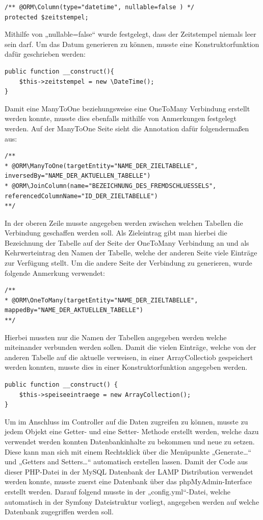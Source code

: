 	\lstset{language=php}
  	\begin{lstlisting}
/** @ORM\Column(type="datetime", nullable=false ) */
protected $zeitstempel;
  	\end{lstlisting}
Mithilfe von „nullable=false“ wurde festgelegt, dass der Zeitstempel niemals leer sein darf.
Um das Datum generieren zu können, musste eine Konstruktorfunktion dafür geschrieben werden:

	\lstset{language=php}
  	\begin{lstlisting}
public function __construct(){
	$this->zeitstempel = new \DateTime();
}
\end{lstlisting}
Damit eine ManyToOne beziehungsweise eine OneToMany Verbindung erstellt werden konnte, musste dies ebenfalls mithilfe von Anmerkungen festgelegt werden.
Auf der ManyToOne Seite sieht die Annotation dafür folgendermaßen aus:

	\lstset{language=php}
  	\begin{lstlisting}
/**
* @ORM\ManyToOne(targetEntity="NAME_DER_ZIELTABELLE",
inversedBy="NAME_DER_AKTUELLEN_TABELLE")
* @ORM\JoinColumn(name="BEZEICHNUNG_DES_FREMDSCHLUESSELS",
referencedColumnName="ID_DER_ZIELTABELLE")
**/
  	\end{lstlisting}
In der oberen Zeile musste angegeben werden zwischen welchen Tabellen die Verbindung geschaffen werden soll. Als Zieleintrag gibt man hierbei die Bezeichnung der Tabelle auf der Seite der OneToMany Verbindung an und als Kehrwerteintrag den Namen der Tabelle, welche der anderen Seite viele Einträge zur Verfügung stellt.
Um die andere Seite der Verbindung zu generieren, wurde folgende Anmerkung verwendet:

	\lstset{language=php}
  	\begin{lstlisting}
/**
* @ORM\OneToMany(targetEntity="NAME_DER_ZIELTABELLE",
mappedBy="NAME_DER_AKTUELLEN_TABELLE")
**/
  	\end{lstlisting}
Hierbei mussten nur die Namen der Tabellen angegeben werden welche miteinander verbunden werden sollen. Damit die vielen Einträge, welche von der anderen Tabelle auf die aktuelle verweisen, in einer ArrayCollectiob gespeichert werden konnten, musste dies in einer Konstruktorfunktion angegeben werden.

	\lstset{language=php}
  	\begin{lstlisting}
public function __construct() {
	$this->speiseeintraege = new ArrayCollection();
}
  	\end{lstlisting}
Um im Anschluss im Controller auf die Daten zugreifen zu können, musste zu jedem Objekt eine Getter- und eine Setter- Methode erstellt werden, welche dazu verwendet werden konnten Datenbankinhalte zu bekommen und neue zu setzen. Diese kann man sich mit einem Rechtsklick über die Menüpunkte „Generate…“ und „Getters and Setters…“ automatisch erstellen lassen.
Damit der Code aus dieser PHP-Datei in der MySQL Datenbank der LAMP Distribution verwendet werden konnte, musste zuerst eine Datenbank über das phpMyAdmin-Interface erstellt werden. Darauf folgend musste in der „config.yml“-Datei, welche automatisch in der Symfony Dateistruktur vorliegt, angegeben werden auf welche Datenbank zugegriffen werden soll.

